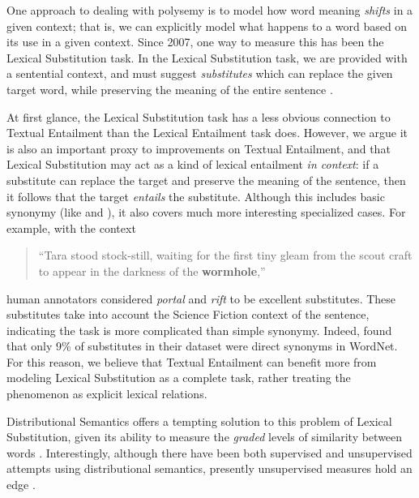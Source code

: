 One approach to dealing with polysemy is to model how word
meaning {\em shifts} in a given context; that is, we can explicitly model what
happens to a word based on its use in a given context. Since 2007, one
way to measure this has been the Lexical Substitution task. In the
Lexical Substitution task, we are provided with a sentential context,
and must suggest {\em substitutes} which can replace the given target word,
while preserving the meaning of the entire sentence
\cite{mccarthy:2007:semeval,biemann:2012:lrec,kremer:2014:eacl}.

At first glance, the Lexical Substitution task has a less obvious connection to
Textual Entailment than the Lexical Entailment task does. However, we argue
it is also an important proxy to improvements on Textual Entailment, and that
Lexical Substitution may act as a kind of lexical entailment {\em
in context}: if a substitute can replace the target and preserve the meaning of
the sentence, then it follows that the target {\em entails} the substitute.
Although this includes basic synonymy (like  and ), it
also covers much more interesting specialized cases. For example, with the
context
\begin{quote}
  ``Tara stood stock-still, waiting for the first tiny gleam from the
  scout craft to appear in the darkness of the {\bf wormhole},''
\end{quote}
human annotators considered {\em portal} and {\em rift} to be excellent
substitutes. These substitutes take into account the Science Fiction context of the
sentence, indicating the task is more complicated than simple synonymy. Indeed,
 found that only 9\% of substitutes in their dataset were
direct synonyms in WordNet.  For this reason, we believe that Textual
Entailment can benefit more from modeling Lexical Substitution as a complete
task, rather treating the phenomenon as explicit lexical relations.

Distributional Semantics offers a tempting solution to this problem of Lexical
Substitution, given its ability to measure the {\em graded} levels of similarity
between words \cite{erk:2008:emnlp}. Interestingly, although there have been
both supervised \cite{biemann:2012:lrec,szarvas:2013:naacl} and unsupervised
attempts
\cite{erk:2008:emnlp,dinu:2010:emnlp,thater:2010:acl,vandecruys:2011:emnlp,kremer:2014:eacl,melamud:2015:naacl,melamud:2015:vsm,kawakami:2016:iclr,roller:2016:naacl}
using distributional semantics, presently unsupervised measures hold
an edge \cite{melamud:2015:naacl,melamud:2016:conll}.



